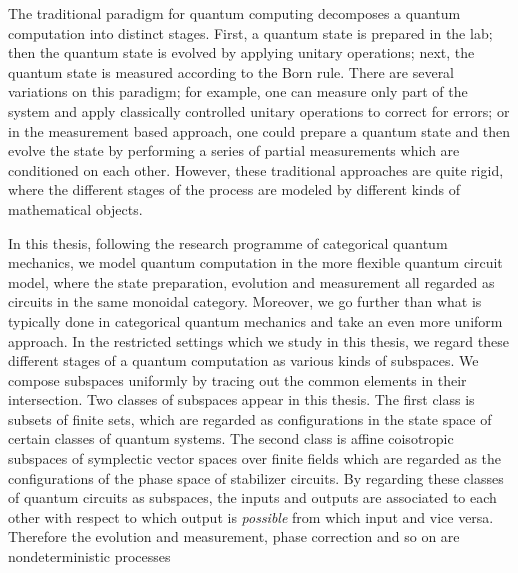 
The traditional paradigm for quantum computing decomposes a quantum computation into  distinct stages. First, a quantum state is prepared in the lab; then the quantum state is evolved by applying unitary operations; next, the quantum state is measured according to the Born rule.  There are several variations on this paradigm; for example,  one can measure only part of the system and apply classically controlled unitary operations to correct for errors; or in the measurement based approach, one could prepare a quantum state and then evolve the state by performing a series of partial measurements which are conditioned on each other. However, these traditional approaches are quite rigid, where the different stages of the process are modeled by different kinds of mathematical objects.  %

In this thesis, following the research programme of categorical quantum mechanics, we model quantum computation in the more flexible quantum circuit model, where the state preparation, evolution and measurement all regarded as circuits in the same monoidal category. Moreover, we go further than what is typically done in  categorical quantum mechanics and  take an even more uniform approach.  In the restricted settings which we study in this thesis,  we regard these different stages of a quantum computation as various kinds of subspaces.  We compose subspaces uniformly by tracing out the common elements in their intersection.  Two classes of subspaces appear in this thesis. The first class is subsets of finite sets, which are regarded as configurations in the state space of certain classes of quantum systems.  The second class is affine coisotropic subspaces of symplectic vector spaces over finite fields which are regarded as the configurations of  the phase space of stabilizer circuits. By regarding these classes of quantum circuits as subspaces, the inputs and outputs are associated to each other with respect to which output is {\em possible} from which input and vice versa.  Therefore the evolution and measurement, phase correction and so on are nondeterministic processes

